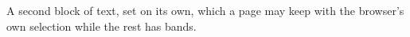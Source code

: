 A second block of text, set on its own, which a page may keep with the
browser's own selection while the rest has bands.
